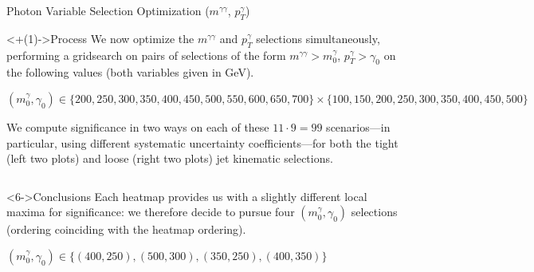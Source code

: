 \documentclass[]{beamer}
\begin{document}
\begin{frame}{Photon Variable Selection Optimization ($m^{\gamma \gamma}$, $p_T^{\gamma}$)}
    \begin{block}<+(1)->{Process}
        We now optimize the $m^{\gamma \gamma}$ and $p_T^{\gamma}$ selections simultaneously, performing a gridsearch on pairs of selections of the form $m^{\gamma \gamma} > m^\gamma_0$, $p_T^\gamma > \gamma_0$ on the following values (both variables given in GeV).
        
        \smallskip
        
        $(m^\gamma_0, \gamma_0) \in \{200, 250, 300, 350, 400, 450, 500, 550, 600, 650, 700\} \times \{100, 150, 200, 250, 300, 350, 400, 450, 500\}$
        
        \smallskip
        
        We compute significance in two ways on each of these $11 \cdot 9 = 99$ scenarios---in particular, using different systematic uncertainty coefficients---for both the tight (left two plots) and loose (right two plots) jet kinematic selections.
    \end{block}
    
    \smallskip
    
    \begin{columns}
    \end{columns}
    
    \smallskip
    
    \begin{block}<6->{Conclusions}
        Each heatmap provides us with a slightly different local maxima for significance: we therefore decide to pursue four $(m^\gamma_0, \gamma_0)$ selections (ordering coinciding with the heatmap ordering).
        
        \smallskip
        
        $(m^\gamma_0, \gamma_0) \in \{(400, 250), (500, 300), (350, 250), (400, 350)\}$
    \end{block}
\end{frame}
\end{document}
